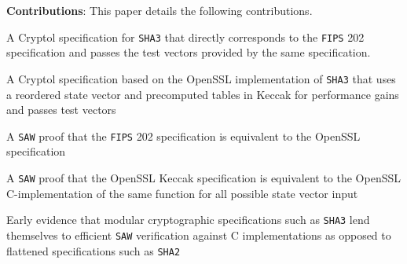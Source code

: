 

\noindent \textbf{Contributions}:
This paper details the following contributions.
\begin{compactitem}
  \item  A Cryptol specification for \texttt{SHA3} that directly corresponds to the \texttt{FIPS} 202 specification and passes the test vectors provided by the same specification.
  \item A Cryptol specification based on the OpenSSL implementation of \texttt{SHA3} that uses a reordered state vector and precomputed tables in Keccak for performance gains and passes test vectors
  \item A \texttt{SAW} proof that the \texttt{FIPS} 202 specification is equivalent to the OpenSSL specification
  \item A \texttt{SAW} proof that the OpenSSL Keccak specification is equivalent to the OpenSSL C-implementation of the same function for all possible state vector input
  \item Early evidence that modular cryptographic specifications such as \texttt{SHA3} lend themselves to efficient \texttt{SAW} verification against C implementations as opposed to flattened specifications such as \texttt{SHA2} 
\end{compactitem}


